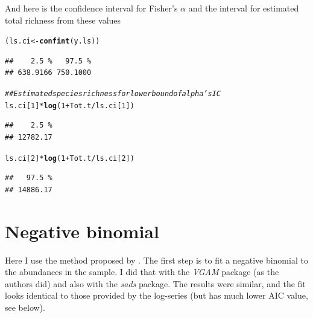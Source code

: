 \documentclass[12pt, A4]{article}\usepackage[]{graphicx}\usepackage[]{color}
\makeatletter
\newcommand{\hlnum}[1]{\textcolor[rgb]{0.686,0.059,0.569}{#1}}%
\newcommand{\hlcom}[1]{\textcolor[rgb]{0.678,0.584,0.686}{\textit{#1}}}%
\newcommand{\hlopt}[1]{\textcolor[rgb]{0,0,0}{#1}}%
\newcommand{\hlstd}[1]{\textcolor[rgb]{0.345,0.345,0.345}{#1}}%
\newcommand{\hlkwb}[1]{\textcolor[rgb]{0.69,0.353,0.396}{#1}}%
\newcommand{\hlkwd}[1]{\textcolor[rgb]{0.737,0.353,0.396}{\textbf{#1}}}%
\newenvironment{kframe}{%
 \def\at@end@of@kframe{}%
 \ifinner\ifhmode%
  \def\at@end@of@kframe{\end{minipage}}%
  \begin{minipage}{\columnwidth}%
 \fi\fi%
 \def\FrameCommand##1{\hskip\@totalleftmargin \hskip-\fboxsep
 \colorbox{shadecolor}{##1}\hskip-\fboxsep
     \hskip-\linewidth \hskip-\@totalleftmargin \hskip\columnwidth}%
 \MakeFramed {\advance\hsize-\width
   \@totalleftmargin\z@ \linewidth\hsize
   \@setminipage}}%
 {\par\unskip\endMakeFramed%
 \at@end@of@kframe}
\newenvironment{knitrout}{}{} %
\makeatother
\begin{document}
And here is the confidence interval for Fisher's $\alpha$ and the
interval for estimated total richness from these values

\begin{knitrout}
\color{fgcolor}\begin{kframe}
\begin{alltt}
\hlstd{(ls.ci} \hlkwb{<-} \hlkwd{confint}\hlstd{(y.ls))}
\end{alltt}
\begin{verbatim}
##    2.5 %   97.5 % 
## 638.9166 750.1000
\end{verbatim}
\begin{alltt}
\hlcom{## Estimated species richness for lower bound of alpha's IC}
\hlstd{ls.ci[}\hlnum{1}\hlstd{]}\hlopt{*}\hlkwd{log}\hlstd{(}\hlnum{1} \hlopt{+} \hlstd{Tot.t}\hlopt{/}\hlstd{ls.ci[}\hlnum{1}\hlstd{])}
\end{alltt}
\begin{verbatim}
##    2.5 % 
## 12782.17
\end{verbatim}
\begin{alltt}
\hlstd{ls.ci[}\hlnum{2}\hlstd{]}\hlopt{*}\hlkwd{log}\hlstd{(}\hlnum{1} \hlopt{+} \hlstd{Tot.t}\hlopt{/}\hlstd{ls.ci[}\hlnum{2}\hlstd{])}
\end{alltt}
\begin{verbatim}
##   97.5 % 
## 14886.17
\end{verbatim}
\end{kframe}
\end{knitrout}

\section*{Negative binomial}

Here I use the method proposed by \citet{tovo2017}. The first step is
to fit a negative binomial to the abundances in the sample.
I did that with the \emph{VGAM} package (as the authors did)
and also with the \emph{sads} package. 
The results were similar, and the fit looks identical to
those provided by the log-series (but has much lower AIC value, see below).
\end{document}
